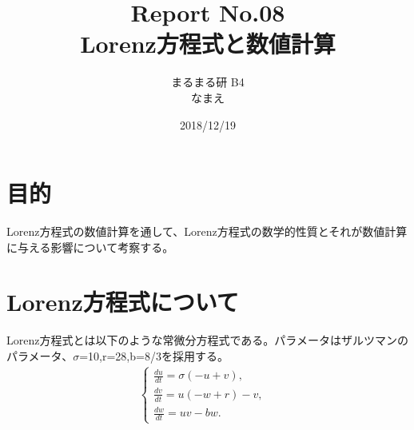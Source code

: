 \documentclass[12pt]{ltjsarticle}
\begin{document}
\begin{titlepage}
\title{Report No.08　\\ Lorenz方程式と数値計算}
\author{まるまる研 B4 \\ なまえ}
\date{2018/12/19}
\maketitle

\end{titlepage}

\section{目的}
Lorenz方程式の数値計算を通して、Lorenz方程式の数学的性質とそれが数値計算に与える影響について考察する。

\section{Lorenz方程式について}
Lorenz方程式とは以下のような常微分方程式である。パラメータはザルツマンのパラメータ、$\sigma$=10,r=28,b=8/3を採用する。
\begin{eqnarray}
    \begin{cases}
        \frac{du}{dt} = \sigma(-u+v), & \\
        \frac{dv}{dt} = u(-w+r)-v, & \\
        \frac{dw}{dt} = uv-bw. &
    \end{cases}
    \label{newton}
\end{eqnarray}
\end{document}
